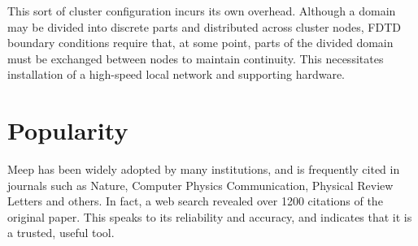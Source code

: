 This sort of cluster configuration incurs its own overhead. Although a domain may be divided into discrete parts and distributed across cluster nodes, FDTD boundary conditions require that, at some point, parts of the divided domain must be exchanged between nodes to maintain continuity. This necessitates installation of a high-speed local network and supporting hardware. 

\section{Popularity}

Meep has been widely adopted by many institutions, and is frequently cited in journals such as Nature\cite{vynck2012photon}\cite{krogstrup2013single}, Computer Physics Communication\cite{liu2012s}, Physical Review Letters\cite{levin2010casimir} and others. In fact, a web search revealed over 1200 citations of the original\cite{OskooiRo10} paper. This speaks to its reliability and accuracy, and indicates that it is a trusted, useful tool.








